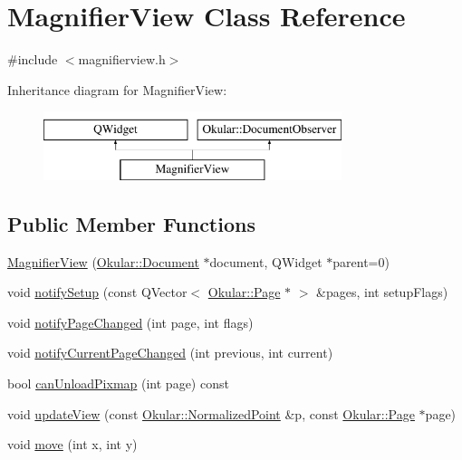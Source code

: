 \hypertarget{classMagnifierView}{\section{Magnifier\+View Class Reference}
\label{classMagnifierView}
}


{\ttfamily \#include $<$magnifierview.\+h$>$}

Inheritance diagram for Magnifier\+View\+:\begin{figure}[H]
\begin{center}
\leavevmode
\includegraphics[height=2.000000cm]{classMagnifierView}
\end{center}
\end{figure}
\subsection*{Public Member Functions}
\begin{DoxyCompactItemize}
\item 
\hyperlink{classMagnifierView_af0c02107c48c06e1b3aae15431b5ba38}{Magnifier\+View} (\hyperlink{classOkular_1_1Document}{Okular\+::\+Document} $\ast$document, Q\+Widget $\ast$parent=0)
\item 
void \hyperlink{classMagnifierView_a8b266a1bef9a6aba74cc75a1c072ada3}{notify\+Setup} (const Q\+Vector$<$ \hyperlink{classOkular_1_1Page}{Okular\+::\+Page} $\ast$ $>$ \&pages, int setup\+Flags)
\item 
void \hyperlink{classMagnifierView_ac38c9bbed5738392072ffdd25e6539df}{notify\+Page\+Changed} (int page, int flags)
\item 
void \hyperlink{classMagnifierView_af9d41d66249590ae036a9f7a13b13386}{notify\+Current\+Page\+Changed} (int previous, int current)
\item 
bool \hyperlink{classMagnifierView_af9c4242a4d8486097b58cebd54d6ef58}{can\+Unload\+Pixmap} (int page) const 
\item 
void \hyperlink{classMagnifierView_a5b8c36b96183a500e1d84f6c392408a5}{update\+View} (const \hyperlink{classOkular_1_1NormalizedPoint}{Okular\+::\+Normalized\+Point} \&p, const \hyperlink{classOkular_1_1Page}{Okular\+::\+Page} $\ast$page)
\item 
void \hyperlink{classMagnifierView_a11896de5b6a1ad7001e42f0a2ebca3d2}{move} (int x, int y)
\end{DoxyCompactItemize}
